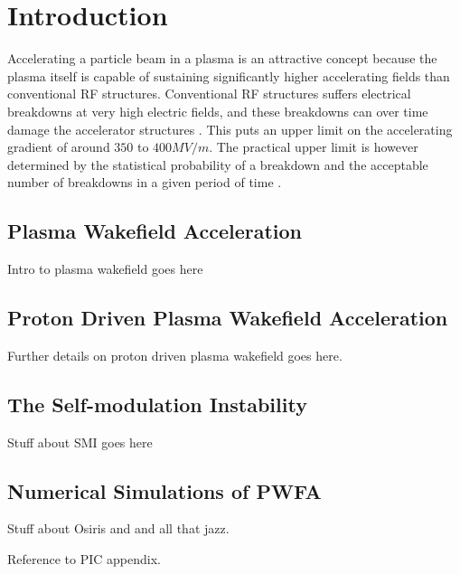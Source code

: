 %
%

\chapter{Introduction}
\label{Ch:Intro}

Accelerating a particle beam in a plasma is an attractive concept because the plasma itself is capable of sustaining
significantly higher accelerating fields than conventional RF structures. Conventional RF structures suffers electrical
breakdowns at very high electric fields, and these breakdowns can over time damage the accelerator structures
\cite{braun:2003}. This puts an upper limit on the accelerating gradient of around $350$ to $400\unit{MV/m}$. The
practical upper limit is however determined by the statistical probability of a breakdown and the acceptable number
of breakdowns in a given period of time \cite{pritzkau:2002}.

\section{Plasma Wakefield Acceleration}
\label{Int:PWFA}

Intro to plasma wakefield goes here

\section{Proton Driven Plasma Wakefield Acceleration}
\label{Int:PDPWFA}

Further details on proton driven plasma wakefield goes here.

\section{The Self-modulation Instability}
\label{Int:SMI}

Stuff about SMI goes here

\section{Numerical Simulations of PWFA}
\label{Int:Sim}

Stuff about Osiris and and all that jazz.

Reference to PIC appendix.

